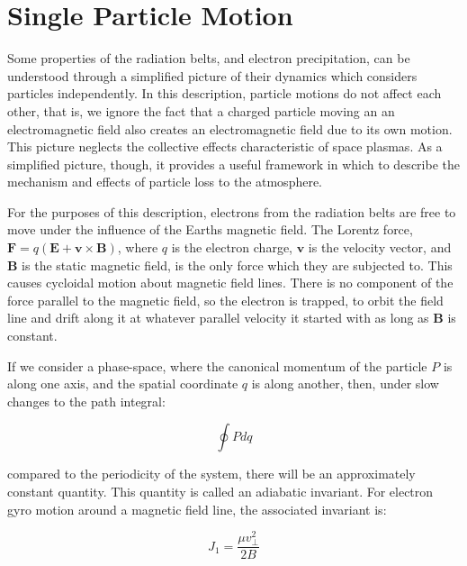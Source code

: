  \section{Single Particle Motion}
 
 Some properties of the radiation belts, and electron precipitation, can be understood through a simplified picture of their dynamics which considers particles independently. In this description, particle motions do not affect each other, that is, we ignore the fact that a charged particle moving an an electromagnetic field also creates an electromagnetic field due to its own motion. This picture neglects the collective effects characteristic of space plasmas. As a simplified picture, though, it provides a useful framework in which to describe the mechanism and effects of particle loss to the atmosphere.

For the purposes of this description, electrons from the radiation belts are free to move under the influence of the Earths magnetic field. The Lorentz force, $\mathbf{F} = q(\mathbf{E} + \mathbf{v}\times\mathbf{B})$, where $q$ is the electron charge, $\mathbf{v}$ is the velocity vector, and $\mathbf{B}$ is the static magnetic field, is the only force which they are subjected to. This causes cycloidal motion about magnetic field lines. There is no component of the force parallel to the magnetic field, so the electron is trapped, to orbit the field line and drift along it at whatever parallel velocity it started with as long as $\mathbf{B}$ is constant. 

If we consider a phase-space, where the canonical momentum of the particle $P$ is along one axis, and the spatial coordinate $q$ is along another, then, under slow changes to the path integral:

$$\oint P dq$$

compared to the periodicity of the system, there will be an approximately constant quantity. This quantity is called an adiabatic invariant. For electron gyro motion around a magnetic field line, the associated invariant is:

$$J_1 = \frac{\mu v_{\perp}^2}{2B}$$

